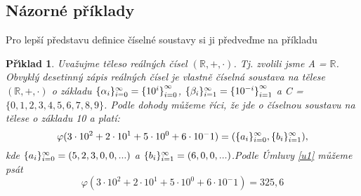 \documentclass[12pt]{book}
\newtheorem{pr}{P\v r\'\i klad}
\begin{document}
\subsection{Názorné příklady}
Pro lepší představu definice číselné soustavy si ji předveďme na příkladu
\begin{pr}
	Uvažujme těleso reálných čísel $(\mathbb{R},+,\cdot)$. Tj. zvolili jsme A = $\mathbb{R}$. Obvyklý desetinný zápis reálných čísel je vlastně číselná soustava na tělese $(\mathbb{R},+,\cdot)$ o základu $\{\alpha_i\}_{i=0}^{\infty}=\{{10^i\}}_{i=0}^{\infty}$, $\{\beta_i\}_{i=1}^{\infty}=\{{10^{-i}\}}_{i=1}^{\infty}$ a C = $\{0,1,2,3,4,5,6,7,8,9\}$. Podle dohody můžeme říci, že jde o číselnou soustavu na tělese o základu 10 a platí:
	$$\varphi(3\cdot10^2+2\cdot10^1+5\cdot10^0+6\cdot10^-1)=(\{a_i\}_{i=0}^{\infty},\{b_i\}_{i=1}^{\infty}),$$kde
	$\{a_i\}_{i=0}^{\infty}=(5,2,3,0,0,...)$ a $\{b_i\}_{i=1}^{\infty} = (6,0,0,...)$.\newline Podle Úmluvy \ref{u1} můžeme psát $$\varphi(3\cdot10^2+2\cdot10^1+5\cdot10^0+6\cdot10^-1)=325,6$$
	
	
	
\end{pr}
\end{document}

